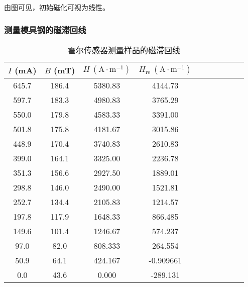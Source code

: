 \documentclass[11pt]{article}
\begin{document}
	由图可见，初始磁化可视为线性。
	
	\subsubsection{测量模具钢的磁滞回线}
	\begin{table}[H]\centering
		\caption{霍尔传感器测量样品的磁滞回线}
		\label{2.2表}
		\begin{tabular}{cccccccccc}\toprule
			$I$ (mA) & $B$ (mT) & $H \ \mathrm{(A\cdot m^{-1})}$ &  $H_{\text{re}} \ \mathrm{(A\cdot m^{-1})}$   \\
			\midrule
			645.7    & 186.4   & 5380.83                        & 4144.73                                 \\
			597.7    & 183.3   & 4980.83                        & 3765.29                                 \\
			550.0    & 179.8   & 4583.33                        & 3391.00                                 \\
			501.8    & 175.8   & 4181.67                        & 3015.86                                 \\
			448.9    & 170.4   & 3740.83                        & 2610.83                                 \\
			399.0    & 164.1   & 3325.00                        & 2236.78                                 \\
			351.3    & 156.6   & 2927.50                        & 1889.01                                 \\
			298.8    & 146.0   & 2490.00                        & 1521.81                                 \\
			252.7    & 134.4   & 2105.83                        & 1214.57                                 \\
			197.8    & 117.9   & 1648.33                        & 866.485                                 \\
			149.6    & 101.4   & 1246.67                        & 574.237                                 \\
			97.0     & 82.0    & 808.333                        & 264.554                                 \\
			50.9     & 64.1    & 424.167                        & -0.909661                                \\
			0.0      & 43.6    & 0.000                          & -289.131                                 \\

\end{tabular}
\end{table}
\end{document}
